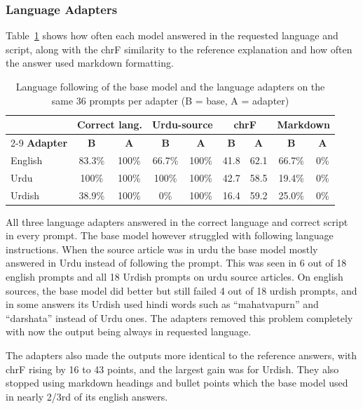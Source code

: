 \documentclass{FastFyp}
\begin{document}
\subsubsection{Language Adapters}
Table~\ref{tab:lang-following} shows how often each model answered in the requested language and script, along with the chrF similarity to the reference explanation and how often the answer used markdown formatting.

\begin{table}[H]
\centering
\caption{Language following of the base model and the language adapters on the same 36 prompts per adapter (B = base, A = adapter)}
\label{tab:lang-following}
\small
\begin{tabular}{|l|c|c|c|c|c|c|c|c|}
\hline
 & \multicolumn{2}{c|}{\textbf{Correct lang.}} & \multicolumn{2}{c|}{\textbf{Urdu-source}} & \multicolumn{2}{c|}{\textbf{chrF}} & \multicolumn{2}{c|}{\textbf{Markdown}} \\ \cline{2-9}
\textbf{Adapter} & \textbf{B} & \textbf{A} & \textbf{B} & \textbf{A} & \textbf{B} & \textbf{A} & \textbf{B} & \textbf{A} \\ \hline
English & 83.3\% & 100\% & 66.7\% & 100\% & 41.8 & 62.1 & 66.7\% & 0\% \\ \hline
Urdu    & 100\%  & 100\% & 100\%  & 100\% & 42.7 & 58.5 & 19.4\% & 0\% \\ \hline
Urdish  & 38.9\% & 100\% & 0\%    & 100\% & 16.4 & 59.2 & 25.0\% & 0\% \\ \hline
\end{tabular}
\end{table}

All three language adapters answered in the correct language and correct script in every prompt. The base model however struggled with following language instructions. When the source article was in urdu the base model mostly answered in Urdu instead of following the prompt. This was seen in 6 out of 18 english prompts and all 18 Urdish prompts on urdu source articles. On english sources, the base model did better but still failed 4 out of 18 urdish prompts, and in some answers its Urdish used hindi words such as ``mahatvapurn'' and ``darshata'' instead of Urdu ones. The adapters removed this problem completely with now the output being always in requested language.

The adapters also made the outputs more identical to the reference answers, with chrF rising by 16 to 43 points, and the largest gain was for Urdish. They also stopped using markdown headings and bullet points which the base model used in nearly 2/3rd of its english answers.
\end{document}

